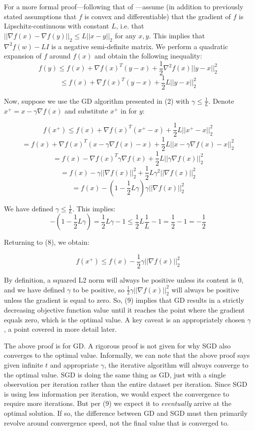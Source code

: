 \documentclass{article}
\begin{document}
For a more formal proof---following that of \cite{tibs_notes}---assume (in addition to previously stated assumptions
that $f$ is convex and differentiable) that the gradient of $f$ is Lipschitz-continuous
with constant $L$, i.e. that $||\nabla f(x) - \nabla f(y)||_2 \leq L||x-y||_2$
for any $x, y$. This implies that $\nabla^2 f(w) - LI$ is a negative
semi-definite matrix. We perform a quadratic expansion of $f$ around $f(x)$ and
obtain the following inequality:
$$
f(y) \leq f(x) + \nabla f(x)^T(y-x) + \frac{1}{2}\nabla^2 f(x)||y-x||_2^2
$$
\begin{equation}
	\leq f(x) + \nabla f(x)^T(y-x) + \frac{1}{2}L||y-x||_2^2
\end{equation}

Now, suppose we use the GD algorithm presented in (2) with $\gamma \leq
\frac{1}{L}$. Denote $x^+ = x - \gamma \nabla
f(x)$ and substitute $x^+$ in for $y$:

$$ f(x^+) \leq f(x) + \nabla f(x)^T(x^+ - x) + \frac{1}{2}L||x^+ - x||_2^2 $$
$$ = f(x) + \nabla f(x)^T(x - \gamma \nabla f(x) - x) + \frac{1}{2}L||x - \gamma \nabla f(x) - x||_2^2 $$
$$ = f(x) - \nabla f(x)^T \gamma \nabla f(x)  + \frac{1}{2}L||\gamma \nabla f(x)||_2^2 $$
$$ = f(x) - \gamma||\nabla f(x)||_2^2 + \frac{1}{2} L \gamma^2||\nabla f(x)||_2^2$$
\begin{equation}
= f(x) - (1 - \frac{1}{2}L\gamma)\gamma||\nabla f(x)||_2^2 
\end{equation}

We have defined $\gamma \leq \frac{1}{L}$. This implies:
$$
-(1 - \frac{1}{2}L \gamma) = \frac{1}{2}L \gamma - 1
\leq \frac{1}{2}L\frac{1}{L} - 1
= \frac{1}{2} - 1
= - \frac{1}{2}
$$

Returning to (8), we obtain:

\begin{equation}
f(x^+) \leq f(x) - \frac{1}{2}\gamma||\nabla f(x)||_2^2
\end{equation}

By definition, a squared L2 norm will always be positive unless its content is
0, and we have defined $\gamma$ to be positive, so $\frac{1}{2} \gamma||\nabla f(x)||_2^2$ will always be positive unless the
gradient is equal to zero. So, (9) implies that GD results in a strictly
decreasing objective function value until it reaches the point where the
gradient equals zero, which is the optimal value. A key caveat is an
appropriately chosen $\gamma$, a point covered in more detail later.

The above proof is for GD. A rigorous proof is not given for why SGD also
converges to the optimal value. Informally, we can note that the above proof
says given infinite $t$ and appropriate $\gamma$, the iterative algorithm will
always converge to the optimal value. SGD is doing the same thing as GD, 
just with a single observation per iteration 
rather than the entire dataset per iteration. Since SGD is using less information
per iteration, we would expect the convergence to require more iterations. But
per (9) we expect it to \textit{eventually} arrive at the optimal solution.
If so, the difference between GD and SGD must then primarily revolve
around convergence speed, not the final value that is converged to.
\end{document}
